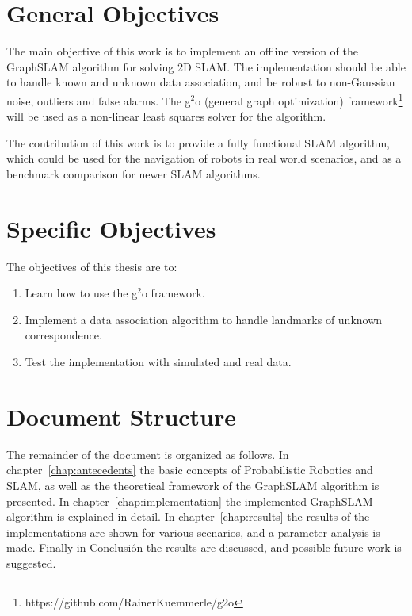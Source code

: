 \section{General Objectives}

The main objective of this work is to implement an offline version of the GraphSLAM algorithm for solving 2D SLAM. The implementation should be able to handle known and unknown data association, and be robust to non-Gaussian noise, outliers and false alarms. The g$^2$o (general graph optimization) framework\footnote{https://github.com/RainerKuemmerle/g2o} will be used as a non-linear least squares solver for the algorithm.

The contribution of this work is to provide a fully functional SLAM algorithm, which could be used for the navigation of robots in real world scenarios, and as a benchmark comparison for newer SLAM algorithms.

\section{Specific Objectives}

The objectives of this thesis are to:

\begin{enumerate}
    \item Learn how to use the g$^2$o framework.
    \item Implement a data association algorithm to handle landmarks of unknown correspondence.
    \item Test the implementation with simulated and real data. 
\end{enumerate}

\section{Document Structure}

The remainder of the document is organized as follows. In chapter~\ref{chap:antecedents} the basic concepts of Probabilistic Robotics and SLAM, as well as the theoretical framework of the GraphSLAM algorithm is presented. In chapter~\ref{chap:implementation} the implemented GraphSLAM algorithm is explained in detail. In chapter~\ref{chap:results} the results of the implementations are shown for various scenarios, and a parameter analysis is made. Finally in Conclusi\'on the results are discussed, and possible future work is suggested. 
